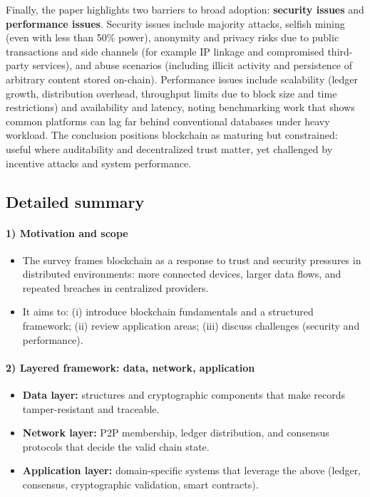 \documentclass[11pt,a4paper]{article}
\begin{document}
Finally, the paper highlights two barriers to broad adoption: \textbf{security issues} and \textbf{performance issues}. Security issues include majority attacks, selfish mining (even with less than 50\% power), anonymity and privacy risks due to public transactions and side channels (for example IP linkage and compromised third-party services), and abuse scenarios (including illicit activity and persistence of arbitrary content stored on-chain). Performance issues include scalability (ledger growth, distribution overhead, throughput limits due to block size and time restrictions) and availability and latency, noting benchmarking work that shows common platforms can lag far behind conventional databases under heavy workload. The conclusion positions blockchain as maturing but constrained: useful where auditability and decentralized trust matter, yet challenged by incentive attacks and system performance.

\subsection{Detailed summary}
\paragraph{1) Motivation and scope}
\begin{itemize}[leftmargin=*]
  \item The survey frames blockchain as a response to trust and security pressures in distributed environments: more connected devices, larger data flows, and repeated breaches in centralized providers.
  \item It aims to: (i) introduce blockchain fundamentals and a structured framework; (ii) review application areas; (iii) discuss challenges (security and performance).
\end{itemize}

\paragraph{2) Layered framework: data, network, application}
\begin{itemize}[leftmargin=*]
  \item \textbf{Data layer:} structures and cryptographic components that make records tamper-resistant and traceable.
  \item \textbf{Network layer:} P2P membership, ledger distribution, and consensus protocols that decide the valid chain state.
  \item \textbf{Application layer:} domain-specific systems that leverage the above (ledger, consensus, cryptographic validation, smart contracts).
\end{itemize}
\end{document}
